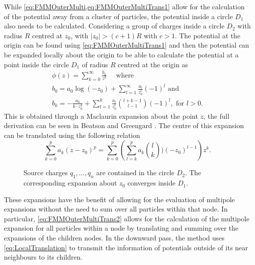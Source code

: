 While \cref{eq:FMMOuterMulti,eq:FMMOuterMultiTrans1} allow for the calculation of the potential away from a cluster of particles, the potential inside a circle $D_1$ also needs to be calculated. Considering a group of charges inside a circle $D_2$ with radius $R$ centred at $z_0$, with $|z_0|>(c+1)R$ with $c>1$. The potential at the origin can be found using \cref{eq:FMMOuterMultiTrans1} and then the potential can be expanded locally about the origin to be able to calculate the potential at a point inside the circle $D_1$ of radius $R$ centred at the origin as
\begin{equation}
\label{eq:FMMInner}
\begin{gathered}
    \phi(z) = \sum_{k=0}^\infty \frac{b_k}{z^k} \quad \text{ where } \\
    b_0 = a_0\log(-z_0) + \sum_{l=1}^\infty \frac{a_l}{z_0^l}(-1)^l \text{ and } \\
    b_k = -\frac{a_0}{k\cdot z_0^k} + \sum_{l=1}^{k} \frac{a_l}{z_0^{l}} \binom{l+k-1}{l-1}(-1)^l, \text{ for } l>0.
\end{gathered}
\end{equation}
This is obtained through a Maclaurin expansion about the point $z$, the full derivation can be seen in Beatson and Greengard \cite{Beatson}. The centre of this expansion can be translated using the following relation
\begin{equation}
    \label{eq:LocalTranslation}
    \sum_{k=0}^p a_k(z-z_0)^p = \sum_{k=0}^{p} \left( \sum_{l=k}^p a_k \binom{l}{k})(-z_0)^{l-1} \right)z^k.
\end{equation}

\begin{figure}
    \centering
        \resizebox{.5\linewidth}{!}{}
    \caption{Source charges $q_1,\dots,q_n$ are contained in the circle $D_2$. The corresponding expansion about $z_0$ converges inside $D_1$.}
    \label{fig:Translation}
\end{figure}

These expansions have the benefit of allowing for the evaluation of multipole expansions without the need to sum over all particles within that node. In particular, \cref{eq:FMMOuterMultiTrans2} allows for the calculation of the multipole expansion for all particles within a node by translating and summing over the expansions of the children nodes. In the downward pass, the method uses \cref{eq:LocalTranslation} to transmit the information of potentials outside of its near neighbours to its children.

